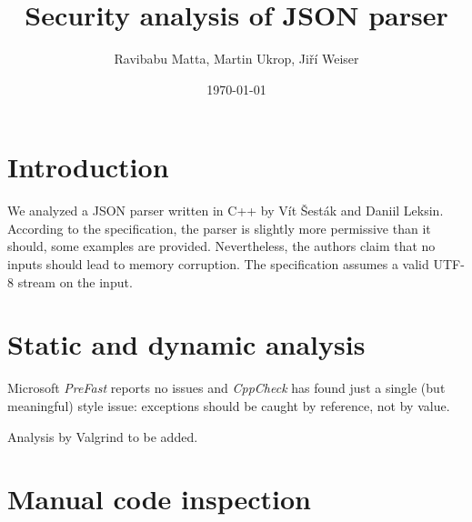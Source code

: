 \documentclass[11pt]{article}
\begin{document}
\title{Security analysis of JSON parser}
\date{\today}
\author{Ravibabu Matta, Martin Ukrop, Jiří Weiser}
\maketitle

\section{Introduction}

We analyzed a JSON parser written in C++ by Vít Šesták and Daniil Leksin. According to the specification, the parser is slightly more permissive than it should, some examples are provided. Nevertheless, the authors claim that no inputs should lead to memory corruption. The specification assumes a valid UTF-8 stream on the input.

\section{Static and dynamic analysis}

Microsoft \textit{PreFast} reports no issues and \textit{CppCheck} has found just a single (but meaningful) style issue: exceptions should be caught by reference, not by value.

Analysis by Valgrind to be added.

\section{Manual code inspection}
\end{document}
